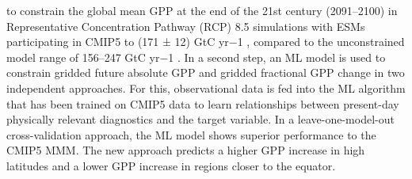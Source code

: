 {  to constrain the global mean GPP at the end of the 21st century (2091–2100)
  in Representative Concentration Pathway (RCP) 8.5 simulations with ESMs
  participating in CMIP5 to (171 ± 12) GtC yr−1 , compared to the unconstrained
  model range of 156–247 GtC yr−1 . In a second step, an ML model is used to
  constrain gridded future absolute GPP and gridded fractional GPP change in
  two independent approaches. For this, observational data is fed into the ML
  algorithm that has been trained on CMIP5 data to learn relationships between
  present-day physically relevant diagnostics and the target variable. In a
  leave-one-model-out cross-validation approach, the ML model shows superior
  performance to the CMIP5 MMM. The new approach predicts a higher GPP increase
  in high latitudes and a lower GPP increase in regions closer to the equator.%
}
